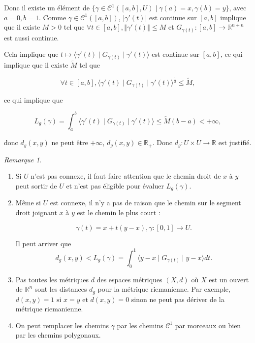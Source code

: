 \documentclass[french]{article}
\theoremstyle{definition}
\theoremstyle{remark}
\newtheorem*{remark}{Remarque}
\newcommand{\lesss}{<}
\newcommand{\less}{\lesss}
\newcommand{\biggg}{>}
\newcommand{\bg}{\biggg}
\begin{document}
Donc il existe un élément de \(\{ \gamma \in \mathcal{C}^1([a,b], U) \mid \gamma(a) = x, \gamma(b) = y\}\), avec \(a = 0, b=1\). Comme \(\gamma \in \mathcal{C}^1([a,b])\), \(\left\lvert \gamma'(t)\right\rvert\) est continue sur \([a,b]\) implique que il existe \(M \bg 0 \) tel que \( \forall t \in [a,b], \left\Vert \gamma'(t) \right\Vert \leq M\) et \(G _{\gamma(t)} :  [a,b] \longrightarrow \mathbb{R}^{n+n}\) est aussi continue.

Cela implique que \( t \longmapsto \langle \gamma'(t) \mid G _{\gamma(t)} \mid \gamma'(t)\rangle\) est continue sur \([a,b]\), ce qui implique que il existe \(\tilde{M}\) tel que

\[\forall t \in [a,b], \langle \gamma'(t) \mid G _{\gamma(t)} \mid \gamma'(t) \rangle ^{\frac{1}{2}} \leq \tilde{M},\]

ce qui implique que

\[L _{g}(\gamma) = \int_{a}^{b}\langle \gamma'(t)\mid G _{\gamma(t)} \mid \gamma'(t) \rangle \leq \tilde{M}(b-a) \less + \infty, \]

donc \(d_g(x,y)\) ne peut être \(+\infty\), \(d_g(x,y) \in \mathbb{R} _{+}\). Donc \(d_g : U \times U \longrightarrow \mathbb{R}\) est justifié.

\begin{remark}

  \

  \begin{enumerate}
    \item Si \(U\) n'est pas connexe, il faut faire attention que le chemin droit de \(x\) à \(y\) peut sortir de \(U\) et n'est pas éligible pour évaluer \(L _{g}(\gamma)\).
    \item Même si \(U\) est connexe, il n'y a pas de raison que le chemin sur le segment droit joignant \(x\) à \(y\) est le chemin le plus court :

    \[\gamma(t) = x + t(y-x), \gamma : [0, 1] \longrightarrow U.\]

    Il peut arriver que \[d_g(x,y) \less L_g(\gamma) = \int_{0}^{1} \langle y-x \mid G _{\gamma(t)} \mid y-x \rangle dt. \]

    \item Pas toutes les métriques \(d\) des espaces métriques \((X,d)\) où \(X\) est un ouvert de \(\mathbb{R}^n\) sont  les distances \(d_g\) pour la métrique riemanienne. Par exemple, \(d(x,y) = 1 \text{ si } x=y \text{ et } d(x,y) =0\) sinon ne peut pas dériver de la métrique riemanienne.

    \item On peut remplacer les chemins \(\gamma\) par les chemins \(\mathcal{C}^1\) par morceaux ou bien par les chemins polygonaux.
  \end{enumerate}
\end{remark}
\end{document}
